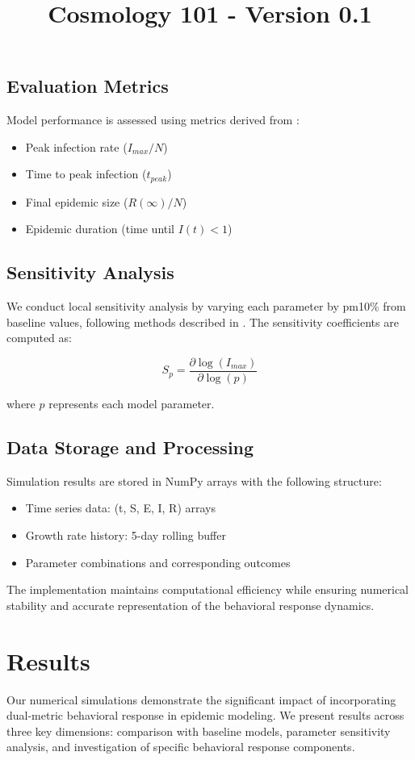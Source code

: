 \documentclass{article}\usepackage{graphicx} \usepackage{amsmath} \usepackage{colortbl}\title{Cosmology 101 - Version 0.1}
\begin{document}
\subsection{Evaluation Metrics}
Model performance is assessed using metrics derived from \cite{anderson1992infectious}:
\begin{itemize}
\item Peak infection rate ($I_{max}/N$)
\item Time to peak infection ($t_{peak}$)
\item Final epidemic size ($R(\infty)/N$)
\item Epidemic duration (time until $I(t) < 1$)
\end{itemize}

\subsection{Sensitivity Analysis}
We conduct local sensitivity analysis by varying each parameter by pm10\% from baseline values, following methods described in \cite{hethcote2000mathematics}. The sensitivity coefficients are computed as:

\begin{equation}
S_p = \frac{\partial \log(I_{max})}{\partial \log(p)}
\end{equation}

where $p$ represents each model parameter.

\subsection{Data Storage and Processing}
Simulation results are stored in NumPy arrays with the following structure:
\begin{itemize}
\item Time series data: (t, S, E, I, R) arrays
\item Growth rate history: 5-day rolling buffer
\item Parameter combinations and corresponding outcomes
\end{itemize}

The implementation maintains computational efficiency while ensuring numerical stability and accurate representation of the behavioral response dynamics.\section{Results}
Our numerical simulations demonstrate the significant impact of incorporating dual-metric behavioral response in epidemic modeling. We present results across three key dimensions: comparison with baseline models, parameter sensitivity analysis, and investigation of specific behavioral response components.
\end{document}
